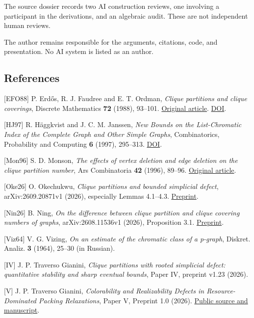 \documentclass[english,11pt,a4paper]{article}
\begin{document}
The source dossier records two AI construction reviews, one involving a
participant in the derivations, and an algebraic audit. These are not
independent human reviews.

The author remains responsible for the arguments, citations, code, and
presentation. No AI system is listed as an author.

\subsection{References}\label{references}

{[}EFO88{]} P. Erdős, R. J. Faudree and E. T. Ordman, \emph{Clique
partitions and clique coverings}, Discrete Mathematics \textbf{72}
(1988), 93--101.
\href{https://www.renyi.hu/~p_erdos/1988-04.pdf}{Original article}.
\href{https://doi.org/10.1016/0012-365X(88)90197-5}{DOI}.

{[}HJ97{]} R. Häggkvist and J. C. M. Janssen, \emph{New Bounds on the
List-Chromatic Index of the Complete Graph and Other Simple Graphs},
Combinatorics, Probability and Computing \textbf{6} (1997), 295--313.
\href{https://doi.org/10.1017/S0963548397002927}{DOI}.

{[}Mon96{]} S. D. Monson, \emph{The effects of vertex deletion and edge
deletion on the clique partition number}, Ars Combinatoria \textbf{42}
(1996), 89--96.
\href{https://combinatorialpress.com/article/ars/Volume\%20042/volume-42-paper-6.pdf}{Original
article}.

{[}Oke26{]} O. Okechukwu, \emph{Clique partitions and bounded simplicial
defect}, arXiv:2609.20871v1 (2026), especially Lemmas 4.1--4.3.
\href{https://arxiv.org/html/2609.20871v1}{Preprint}.

{[}Nin26{]} B. Ning, \emph{On the difference between clique partition
and clique covering numbers of graphs}, arXiv:2608.11536v1 (2026),
Proposition 3.1. \href{https://arxiv.org/html/2608.11536v1}{Preprint}.

{[}Viz64{]} V. G. Vizing, \emph{On an estimate of the chromatic class of
a p-graph}, Diskret. Analiz. \textbf{3} (1964), 25--30 (in Russian).

{[}IV{]} J. P. Traverso Gianini, \emph{Clique partitions with rooted
simplicial defect: quantitative stability and sharp eventual bounds},
Paper IV, preprint v1.23 (2026).

{[}V{]} J. P. Traverso Gianini, \emph{Colorability and Realizability
Defects in Resource-Dominated Packing Relaxations}, Paper V, Preprint
1.0 (2026).
\href{https://github.com/jtraverso/erdos-81-chordal-clique-partitions/tree/main/preprints/PAPER_V}{Public
source and manuscript}.
\end{document}
